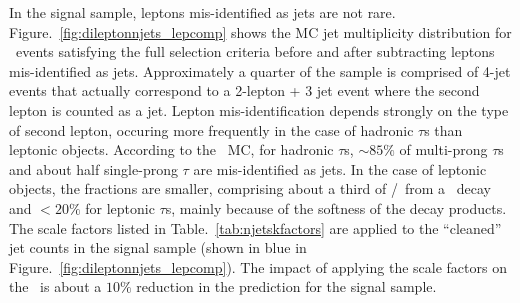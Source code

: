 In the signal sample, leptons mis-identified as jets are not rare. 
Figure.~\ref{fig:dileptonnjets_lepcomp}  shows the MC jet
multiplicity distribution for \ttll\ events satisfying the full
selection criteria before and after subtracting leptons mis-identified
as jets. Approximately a quarter of the sample is comprised of 4-jet
events that actually correspond to a 2-lepton + 3 jet event where the second
lepton is counted as a jet. Lepton mis-identification depends strongly
on the type of second lepton, occuring more frequently in the case of
hadronic $\tau$s than leptonic objects. According to the \ttll\
MC, for hadronic $\tau$s, $\sim85\%$ of multi-prong $\tau$s and about half
single-prong $\tau$ are mis-identified as jets. In the case of
leptonic objects, the fractions are smaller, comprising about a third
of \E/\M\ from a \W\ decay and $<20\%$ for leptonic $\tau$s, 
mainly because of the softness of the decay products. 
The scale factors listed in Table.~\ref{tab:njetskfactors} are applied
to the ``cleaned'' jet counts in the signal sample (shown in blue in
Figure.~\ref{fig:dileptonnjets_lepcomp}). The impact of applying the
scale factors on the \ttll\ is about a $10\%$ reduction in the
prediction for the signal sample. 


